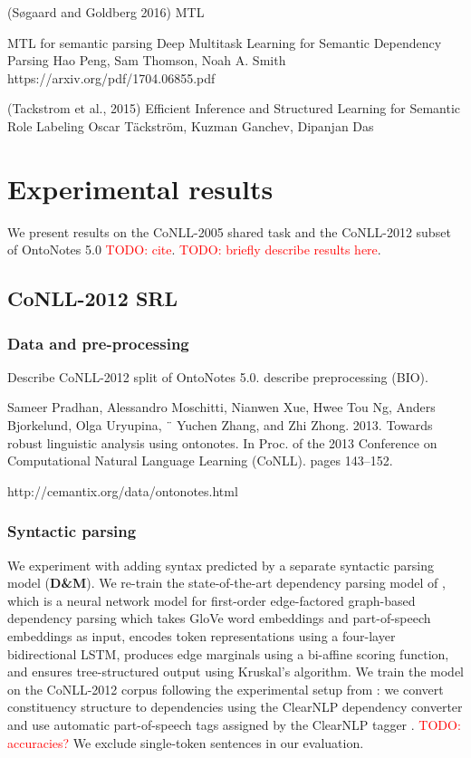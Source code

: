 \documentclass[11pt,a4paper]{article}
\newcommand{\todo}[1]{\textcolor{red}{TODO: #1}}
\begin{document}
(Søgaard and Goldberg 2016) MTL

MTL for semantic parsing
Deep Multitask Learning for Semantic Dependency Parsing
Hao Peng, Sam Thomson, Noah A. Smith
https://arxiv.org/pdf/1704.06855.pdf



(Tackstrom et al., 2015)
Efficient Inference and Structured Learning
for Semantic Role Labeling
Oscar Täckström, Kuzman Ganchev, Dipanjan Das


\section{Experimental results}

We present results on the CoNLL-2005 shared task and the CoNLL-2012 subset of OntoNotes 5.0 \todo{cite}. \todo{briefly describe results here}.

\subsection{CoNLL-2012 SRL}

\subsubsection{Data and pre-processing}

Describe CoNLL-2012 split of OntoNotes 5.0. describe preprocessing (BIO).

Sameer Pradhan, Alessandro Moschitti, Nianwen Xue,
Hwee Tou Ng, Anders Bjorkelund, Olga Uryupina, ¨
Yuchen Zhang, and Zhi Zhong. 2013. Towards robust
linguistic analysis using ontonotes. In Proc.
of the 2013 Conference on Computational Natural
Language Learning (CoNLL). pages 143–152.

http://cemantix.org/data/ontonotes.html


\subsubsection{Syntactic parsing \label{dozat-parser-sec}}

We experiment with adding syntax predicted by a separate syntactic parsing model ({\bf D\&M}). We re-train the state-of-the-art dependency parsing model of \citet{dozat2016deep}, which is a neural network model for first-order edge-factored graph-based dependency parsing which takes GloVe word embeddings and part-of-speech embeddings as input, encodes token representations using a four-layer bidirectional LSTM, produces edge marginals using a bi-affine scoring function, and ensures tree-structured output using Kruskal's algorithm. We train the model on the CoNLL-2012 corpus following the experimental setup from \citet{choi2015it}: we convert constituency structure to dependencies using the ClearNLP dependency converter \citep{choi2012guidelines} and use automatic part-of-speech tags assigned by the ClearNLP tagger \citep{choi2012fast}. \todo{accuracies?} We exclude single-token sentences in our evaluation.
\end{document}
